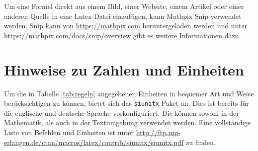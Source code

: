 Um eine Formel direkt aus einem Bild, einer Website, einem Artikel oder einer anderen Quelle in eine Latex-Datei einzufügen, kann Mathpix Snip verwendet werden. Snip kann von \url{ https://mathpix.com} heruntergeladen werden und unter \url{https://mathpix.com/docs/snip/overview} gibt es weitere Informationen dazu.

\section{Hinweise zu Zahlen und Einheiten}

Um die in Tabelle \ref{tab:regeln} angegebenen Einheiten in bequemer Art und Weise berücksichtigen zu können, bietet sich das \texttt{siunitx}-Paket an. Dies ist bereits für die englische und deutsche Sprache vorkonfiguriert.
Die können sowohl in der Mathematik, als auch in der Textumgebung verwendet werden.
Eine vollständige Liste von Befehlen und Einheiten ist unter \url{http://ftp.uni-erlangen.de/ctan/macros/latex/contrib/siunitx/siunitx.pdf} zu finden.

